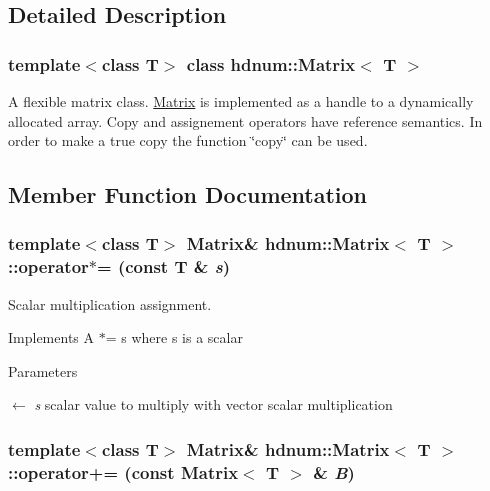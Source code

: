 \subsection{Detailed Description}
\subsubsection*{template$<$class T$>$ class hdnum::Matrix$<$ T $>$}

A flexible matrix class. \hyperlink{classhdnum_1_1Matrix}{Matrix} is implemented as a handle to a dynamically allocated array. Copy and assignement operators have reference semantics. In order to make a true copy the function \char`\"{}copy\char`\"{} can be used. 

\subsection{Member Function Documentation}
\hypertarget{classhdnum_1_1Matrix_adc378774314424fd9c5600bc34bed356}{
\subsubsection[{operator$\ast$=}]{\setlength{\rightskip}{0pt plus 5cm}template$<$class T$>$ {\bf Matrix}\& {\bf hdnum::Matrix}$<$ T $>$::operator$\ast$= (const T \& {\em s})}}
\label{classhdnum_1_1Matrix_adc378774314424fd9c5600bc34bed356}


Scalar multiplication assignment. 

Implements A $\ast$= s where s is a scalar


\begin{DoxyParams}{Parameters}
\item[\mbox{$\leftarrow$} {\em s}]scalar value to multiply with vector scalar multiplication \end{DoxyParams}
\hypertarget{classhdnum_1_1Matrix_a4f3f23f9a07540723601283d034c10ae}{
\subsubsection[{operator+=}]{\setlength{\rightskip}{0pt plus 5cm}template$<$class T$>$ {\bf Matrix}\& {\bf hdnum::Matrix}$<$ T $>$::operator+= (const {\bf Matrix}$<$ T $>$ \& {\em B})}}
\label{classhdnum_1_1Matrix_a4f3f23f9a07540723601283d034c10ae}


